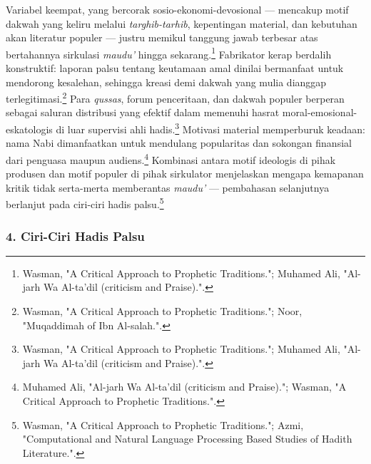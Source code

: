 Variabel keempat, yang bercorak sosio-ekonomi-devosional --- mencakup motif dakwah yang keliru melalui \textit{targhib-tarhib}, kepentingan material, dan kebutuhan akan literatur populer --- justru memikul tanggung jawab terbesar atas bertahannya sirkulasi \textit{maudu'} hingga sekarang.\footnote{Wasman, "A Critical Approach to Prophetic Traditions."; Muhamed Ali, "Al-jarh Wa Al-ta'dil (criticism and Praise).".} Fabrikator kerap berdalih konstruktif: laporan palsu tentang keutamaan amal dinilai bermanfaat untuk mendorong kesalehan, sehingga kreasi demi dakwah yang mulia dianggap terlegitimasi.\footnote{Wasman, "A Critical Approach to Prophetic Traditions."; Noor, "Muqaddimah of Ibn Al-salah.".} Para \textit{qussas}, forum penceritaan, dan dakwah populer berperan sebagai saluran distribusi yang efektif dalam memenuhi hasrat moral-emosional-eskatologis di luar supervisi ahli hadis.\footnote{Wasman, "A Critical Approach to Prophetic Traditions."; Muhamed Ali, "Al-jarh Wa Al-ta'dil (criticism and Praise).".} Motivasi material memperburuk keadaan: nama Nabi dimanfaatkan untuk mendulang popularitas dan sokongan finansial dari penguasa maupun audiens.\footnote{Muhamed Ali, "Al-jarh Wa Al-ta'dil (criticism and Praise)."; Wasman, "A Critical Approach to Prophetic Traditions.".} Kombinasi antara motif ideologis di pihak produsen dan motif populer di pihak sirkulator menjelaskan mengapa kemapanan kritik tidak serta-merta memberantas \textit{maudu'} --- pembahasan selanjutnya berlanjut pada ciri-ciri hadis palsu.\footnote{Wasman, "A Critical Approach to Prophetic Traditions."; Azmi, "Computational and Natural Language Processing Based Studies of Hadith Literature.".}

\subsubsection*{4. Ciri-Ciri Hadis Palsu}


